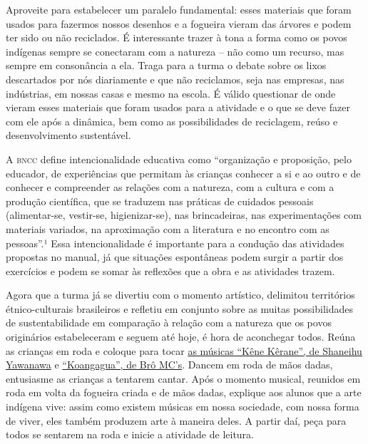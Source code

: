 \documentclass[11pt]{extarticle}
\begin{document}
Aproveite para estabelecer um paralelo fundamental: esses materiais que foram usados para fazermos nossos desenhos e a fogueira vieram das árvores e podem ter sido ou não reciclados. É interessante trazer à tona a forma como os povos indígenas sempre se conectaram com a natureza -- não como um recurso, mas sempre em consonância a ela. Traga para a turma o debate sobre os lixos descartados por nós diariamente e que não reciclamos, seja nas empresas, nas indústrias, em nossas casas e mesmo na escola. É válido questionar de onde vieram esses materiais que foram usados para a atividade e o que se deve fazer com ele após a dinâmica, bem como as possibilidades de reciclagem, reúso e desenvolvimento sustentável. 


A \textsc{bncc} define intencionalidade educativa como “organização e proposição, pelo educador, de experiências que permitam às crianças conhecer a si e ao outro e de conhecer e compreender as relações com a natureza, com a cultura e com a produção científica, que se traduzem nas práticas de cuidados pessoais (alimentar-se, vestir-se, higienizar-se), nas brincadeiras, nas experimentações com materiais variados, na aproximação com a literatura e no encontro com as pessoas”.¹ Essa intencionalidade é importante para a condução das atividades propostas no manual, já que situações espontâneas podem surgir a partir dos exercícios e podem se somar às reflexões que a obra e as atividades trazem.

Agora que a turma já se divertiu com o momento artístico, delimitou territórios étnico-culturais brasileiros e refletiu em conjunto sobre as muitas possibilidades de sustentabilidade em comparação à relação com a natureza que os povos originários estabeleceram e seguem até hoje, é hora de aconchegar todos. Reúna as crianças em roda e coloque para tocar \href{https://www.youtube.com/watch?v=7hf4t9u44qs}{as músicas  ``Kêne Kêrane'', de Shaneihu Yawanawa} e \href{https://www.youtube.com/watch?v=IBafJlZxT6s}{``Koangagua'', de Brô MC's}. Dancem em roda de mãos dadas, entusiasme as crianças a tentarem cantar. Após o momento musical, reunidos em roda em volta da fogueira criada e de mãos dadas, explique aos alunos que a arte indígena vive: assim como existem músicas em nossa sociedade, com nossa forma de viver, eles também produzem arte à maneira deles. A partir daí, peça para todos se sentarem na roda e inicie a atividade de leitura. 
\end{document}
